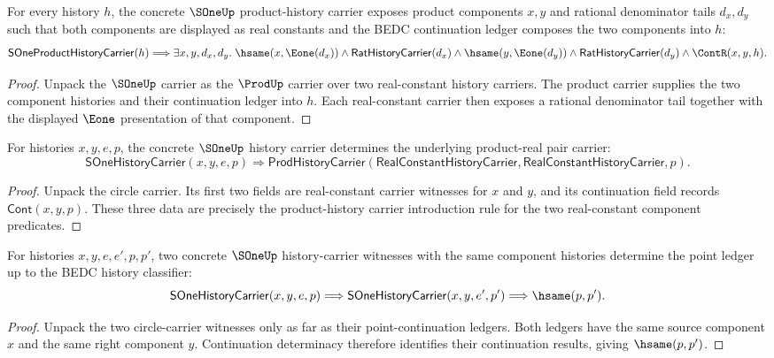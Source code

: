 \begin{theorem}
\label{thm:s1-history-carrier-rational-components}
For every history $h$, the concrete $\SOneUp$ product-history carrier exposes
product components $x,y$ and rational denominator tails $d_x,d_y$ such that
both components are displayed as real constants and the BEDC continuation
ledger composes the two components into $h$:
$$
\mathsf{SOneProductHistoryCarrier}(h)
\Longrightarrow
\exists x,y,d_x,d_y.\;
\hsame(x,\Eone(d_x))\land
\mathsf{RatHistoryCarrier}(d_x)\land
\hsame(y,\Eone(d_y))\land
\mathsf{RatHistoryCarrier}(d_y)\land
\ContR(x,y,h).
$$
\end{theorem}
\begin{proof}
Unpack the $\SOneUp$ carrier as the $\ProdUp$ carrier over two real-constant
history carriers. The product carrier supplies the two component histories and
their continuation ledger into $h$. Each real-constant carrier then exposes a
rational denominator tail together with the displayed $\Eone$ presentation of
that component.
\end{proof}

\begin{theorem}
\label{thm:s1-history-carrier-real-pair}
For histories $x,y,e,p$, the concrete $\SOneUp$ history carrier determines the
underlying product-real pair carrier:
$$
\mathsf{SOneHistoryCarrier}(x,y,e,p)
\Longrightarrow
\mathsf{ProdHistoryCarrier}(\mathsf{RealConstantHistoryCarrier},
\mathsf{RealConstantHistoryCarrier},p).
$$
\end{theorem}
\begin{proof}
Unpack the circle carrier. Its first two fields are real-constant carrier
witnesses for $x$ and $y$, and its continuation field records
$\mathsf{Cont}(x,y,p)$. These three data are precisely the product-history
carrier introduction rule for the two real-constant component predicates.
\end{proof}

\begin{theorem}
\label{thm:s1-history-carrier-point-deterministic}
For histories $x,y,e,e',p,p'$, two concrete $\SOneUp$ history-carrier witnesses
with the same component histories determine the point ledger up to the BEDC
history classifier:
$$
\mathsf{SOneHistoryCarrier}(x,y,e,p)
\Longrightarrow
\mathsf{SOneHistoryCarrier}(x,y,e',p')
\Longrightarrow
\hsame(p,p').
$$
\end{theorem}
\begin{proof}
Unpack the two circle-carrier witnesses only as far as their point-continuation
ledgers. Both ledgers have the same source component $x$ and the same right
component $y$. Continuation determinacy therefore identifies their continuation
results, giving $\hsame(p,p')$.
\end{proof}


